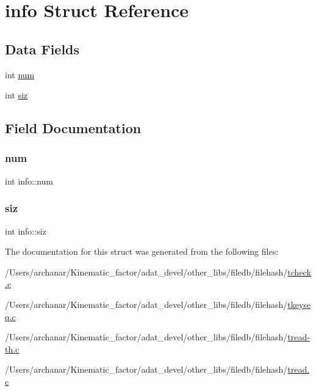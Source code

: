 \hypertarget{structinfo}{}\section{info Struct Reference}
\label{structinfo}
\subsection*{Data Fields}
\begin{DoxyCompactItemize}
\item 
int \mbox{\hyperlink{structinfo_abb5c86ef42017dac754a087c6bc0bd56}{num}}
\item 
int \mbox{\hyperlink{structinfo_ab47b7116d4e2bfcfdfa6dfb0254439db}{siz}}
\end{DoxyCompactItemize}


\subsection{Field Documentation}
\mbox{\label{structinfo_abb5c86ef42017dac754a087c6bc0bd56}} 
\subsubsection{\texorpdfstring{num}{num}}
{\footnotesize\ttfamily int info\+::num}

\mbox{\label{structinfo_ab47b7116d4e2bfcfdfa6dfb0254439db}} 
\subsubsection{\texorpdfstring{siz}{siz}}
{\footnotesize\ttfamily int info\+::siz}



The documentation for this struct was generated from the following files\+:\begin{DoxyCompactItemize}
\item 
/\+Users/archanar/\+Kinematic\+\_\+factor/adat\+\_\+devel/other\+\_\+libs/filedb/filehash/\mbox{\hyperlink{tcheck_8c}{tcheck.\+c}}\item 
/\+Users/archanar/\+Kinematic\+\_\+factor/adat\+\_\+devel/other\+\_\+libs/filedb/filehash/\mbox{\hyperlink{tkeyseq_8c}{tkeyseq.\+c}}\item 
/\+Users/archanar/\+Kinematic\+\_\+factor/adat\+\_\+devel/other\+\_\+libs/filedb/filehash/\mbox{\hyperlink{tread-th_8c}{tread-\/th.\+c}}\item 
/\+Users/archanar/\+Kinematic\+\_\+factor/adat\+\_\+devel/other\+\_\+libs/filedb/filehash/\mbox{\hyperlink{tread_8c}{tread.\+c}}\end{DoxyCompactItemize}
